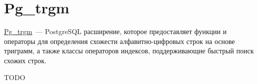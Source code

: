 \section{Pg\_trgm}

\href{https://www.postgresql.org/docs/current/static/pgtrgm.html}{Pg\_trgm}~--- PostgreSQL расширение, которое предоставляет функции и операторы для определения схожести алфавитно-цифровых строк на основе триграмм, а также классы операторов индексов, поддерживающие быстрый поиск схожих строк.

TODO
